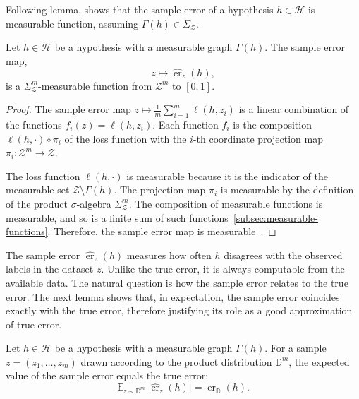 Following lemma, shows that the sample error of a hypothesis $h \in \mathcal{H}$ is measurable function, assuming $\Gamma(h) \in \Sigma_{\mathcal{Z}}$.

\begin{lemma}
    \label{lem:sample-error-measurable}
    Let $h \in \mathcal{H}$ be a hypothesis with a measurable graph $\Gamma(h)$. The sample error map,
    \[
        z \mapsto \hat{\operatorname{er}}_{z}(h),
    \]
    is a $\Sigma_{\mathcal{Z}}^m$-measurable function from $\mathcal{Z}^m$ to $[0,1]$.
\end{lemma}

\begin{proof}

    The sample error map $z \mapsto \frac{1}{m}\sum_{i=1}^m \ell(h,z_i)$ is a linear combination of the functions $f_i(z) = \ell(h,z_i)$. Each function $f_i$ is the composition $\ell(h, \cdot) \circ \pi_i$ of the loss function with the $i$-th coordinate projection map $\pi_i: \mathcal{Z}^m \to \mathcal{Z}$.

    The loss function $\ell(h, \cdot)$ is measurable because it is the indicator of the measurable set $\mathcal{Z}\setminus\Gamma(h)$. The projection map $\pi_i$ is measurable by the definition of the product $\sigma$-algebra $\Sigma_{\mathcal{Z}}^m$. The composition of measurable functions is measurable, and so is a finite sum of such functions~\ref{subsec:measurable-functions}. Therefore, the sample error map is measurable~\cite[Prop 2.4]{FollandRealAnalysis}.
    \qedhere
\end{proof}

The sample error $\hat{\operatorname{er}}_z(h)$ measures how often $h$ disagrees with the observed labels in the dataset $z$.
Unlike the true error, it is always computable from the available data. The natural question is how the sample error relates to the true error.  The next lemma shows that, in expectation, the sample error coincides exactly with the true error, therefore justifying its role as a good approximation of true error.

\begin{lemma}
    \label{lem:sample-error-unbiased}
    Let $h \in \mathcal{H}$ be a hypothesis with a measurable graph $\Gamma(h)$. For a sample $z = (z_1, \dots, z_m)$ drawn according to the product distribution $\mathbb{D}^m$, the expected value of the sample error equals the true error:
    \[
        \mathbb{E}_{z\sim\mathbb{D}^m}\bigl[\hat{\operatorname{er}}_{z}(h)\bigr] = \operatorname{er}_{\mathbb{D}}(h).
    \]
\end{lemma}


